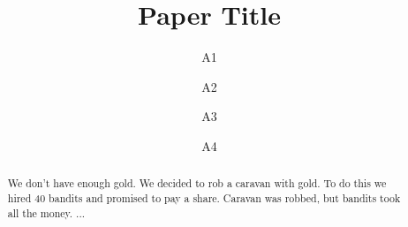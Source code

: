 \documentclass[twocolumn,final]{svjour3}
\begin{document}
\author{A1 \and A2 \and A3 \and A4}
\title{Paper Title}
\maketitle{}					%


\begin{abstract}
We don't have enough gold.
We decided to rob a caravan with gold.
To do this we hired 40 bandits and promised to pay a share.
Caravan was robbed, but bandits took all the money.
...
\end{abstract}










\end{document}

